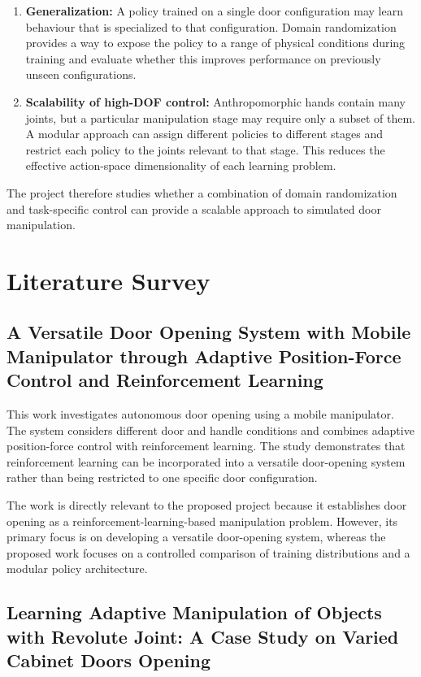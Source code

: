 \documentclass[12pt,a4paper]{report}
\begin{document}
\begin{enumerate}
    \item \textbf{Generalization:} A policy trained on a single door configuration may learn behaviour that is specialized to that configuration. Domain randomization provides a way to expose the policy to a range of physical conditions during training and evaluate whether this improves performance on previously unseen configurations.

    \item \textbf{Scalability of high-DOF control:} Anthropomorphic hands contain many joints, but a particular manipulation stage may require only a subset of them. A modular approach can assign different policies to different stages and restrict each policy to the joints relevant to that stage. This reduces the effective action-space dimensionality of each learning problem.
\end{enumerate}

The project therefore studies whether a combination of domain randomization and task-specific control can provide a scalable approach to simulated door manipulation.

\section{Literature Survey}

\subsection{A Versatile Door Opening System with Mobile Manipulator through Adaptive Position-Force Control and Reinforcement Learning}

This work investigates autonomous door opening using a mobile manipulator. The system considers different door and handle conditions and combines adaptive position-force control with reinforcement learning. The study demonstrates that reinforcement learning can be incorporated into a versatile door-opening system rather than being restricted to one specific door configuration.

The work is directly relevant to the proposed project because it establishes door opening as a reinforcement-learning-based manipulation problem. However, its primary focus is on developing a versatile door-opening system, whereas the proposed work focuses on a controlled comparison of training distributions and a modular policy architecture.

\subsection{Learning Adaptive Manipulation of Objects with Revolute Joint: A Case Study on Varied Cabinet Doors Opening}
\end{document}
